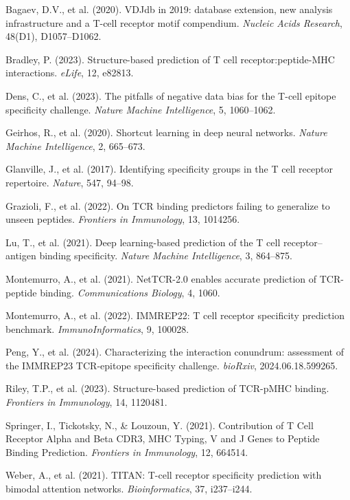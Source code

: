 \documentclass[11pt, a4paper]{article}
\begin{document}
\small
\begin{enumerate}[label={[\arabic*]}, noitemsep, leftmargin=*]
\item Bagaev, D.V., et al. (2020). VDJdb in 2019: database extension, new analysis infrastructure and a T-cell receptor motif compendium. \textit{Nucleic Acids Research}, 48(D1), D1057--D1062.
\item Bradley, P. (2023). Structure-based prediction of T cell receptor:peptide-MHC interactions. \textit{eLife}, 12, e82813.
\item Dens, C., et al. (2023). The pitfalls of negative data bias for the T-cell epitope specificity challenge. \textit{Nature Machine Intelligence}, 5, 1060--1062.
\item Geirhos, R., et al. (2020). Shortcut learning in deep neural networks. \textit{Nature Machine Intelligence}, 2, 665--673.
\item Glanville, J., et al. (2017). Identifying specificity groups in the T cell receptor repertoire. \textit{Nature}, 547, 94--98.
\item Grazioli, F., et al. (2022). On TCR binding predictors failing to generalize to unseen peptides. \textit{Frontiers in Immunology}, 13, 1014256.
\item Lu, T., et al. (2021). Deep learning-based prediction of the T cell receptor--antigen binding specificity. \textit{Nature Machine Intelligence}, 3, 864--875.
\item Montemurro, A., et al. (2021). NetTCR-2.0 enables accurate prediction of TCR-peptide binding. \textit{Communications Biology}, 4, 1060.
\item Montemurro, A., et al. (2022). IMMREP22: T cell receptor specificity prediction benchmark. \textit{ImmunoInformatics}, 9, 100028.
\item Peng, Y., et al. (2024). Characterizing the interaction conundrum: assessment of the IMMREP23 TCR-epitope specificity challenge. \textit{bioRxiv}, 2024.06.18.599265.
\item Riley, T.P., et al. (2023). Structure-based prediction of TCR-pMHC binding. \textit{Frontiers in Immunology}, 14, 1120481.
\item Springer, I., Tickotsky, N., \& Louzoun, Y. (2021). Contribution of T Cell Receptor Alpha and Beta CDR3, MHC Typing, V and J Genes to Peptide Binding Prediction. \textit{Frontiers in Immunology}, 12, 664514.
\item Weber, A., et al. (2021). TITAN: T-cell receptor specificity prediction with bimodal attention networks. \textit{Bioinformatics}, 37, i237--i244.

\end{enumerate}
\end{document}
